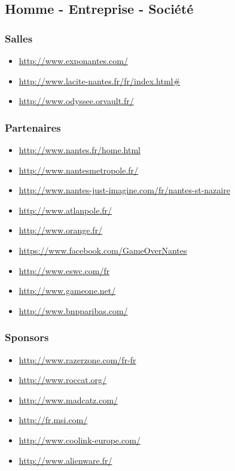 \documentclass[french]{article}
\begin{document}
\subsection{Homme - Entreprise - Société}

\subsubsection*{Salles}
\begin{itemize}
\item \url{http://www.exponantes.com/}
\item \url{http://www.lacite-nantes.fr/fr/index.html#}
\item \url{http://www.odyssee.orvault.fr/}
\end{itemize}

\subsubsection*{Partenaires}
\begin{itemize}
\item \url{http://www.nantes.fr/home.html}
\item \url{http://www.nantesmetropole.fr/}
\item \url{http://www.nantes-just-imagine.com/fr/nantes-st-nazaire}
\item \url{http://www.atlanpole.fr/}
\item \url{http://www.orange.fr/}
\item \url{https://www.facebook.com/GameOverNantes}
\item \url{http://www.eswc.com/fr}
\item \url{http://www.gameone.net/}
\item \url{http://www.bnpparibas.com/}
\end{itemize}

\subsubsection*{Sponsors}
\begin{itemize}
\item \url{http://www.razerzone.com/fr-fr}
\item \url{http://www.roccat.org/}
\item \url{http://www.madcatz.com/}
\item \url{http://fr.msi.com/}
\item \url{http://www.coolink-europe.com/}
\item \url{http://www.alienware.fr/}
\end{itemize}
\end{document}
